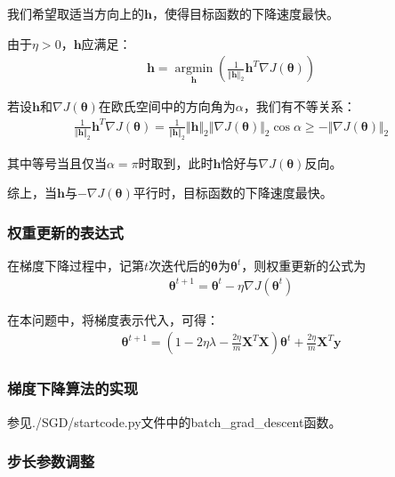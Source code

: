 \documentclass[12pt, a4paper]{article}
\newcommand{\imat}{\bm}
\newcommand{\ivec}{\bm}
\newcommand{\argmin}{\mathop{\arg\min}\limits_}
\newcommand{\Xm}{\imat{X}}
\newcommand{\thetav}{\ivec{\theta}}
\newcommand{\yv}{\ivec{y}}
\newcommand{\hv}{\ivec{h}}
\begin{document}
        我们希望取适当方向上的$\hv$，使得目标函数的下降速度最快。

        由于$\eta > 0$，$\hv$应满足：
        \begin{align*}
        \hv = \argmin{\hv} (\frac{1}{\Vert \hv \Vert_2} \hv^T \nabla J(\thetav))
        \end{align*}

        若设$\hv$和$\nabla J(\thetav)$在欧氏空间中的方向角为$\alpha$，我们有不等关系：
        \begin{align*}
        \frac{1}{\Vert \hv \Vert_2} \hv^T \nabla J(\thetav)
        = \frac{1}{\Vert \hv \Vert_2} \Vert \hv\Vert_2 \Vert \nabla J(\thetav) \Vert_2 \cos{\alpha}
        \ge - \Vert \nabla J(\thetav) \Vert_2
        \end{align*}

        其中等号当且仅当$\alpha = \pi$时取到，此时$\hv$恰好与$\nabla J(\thetav)$反向。

        综上，当$\hv$与$- \nabla J(\thetav)$平行时，目标函数的下降速度最快。

    \subsubsection{权重更新的表达式}

        在梯度下降过程中，记第$t$次迭代后的$\thetav$为$\thetav^t$，则权重更新的公式为
        \begin{equation}\begin{aligned}
        \thetav^{t+1} = \thetav^t - \eta \nabla J(\thetav^t)
        \end{aligned}\end{equation}

        在本问题中，将梯度表示代入，可得：
        \begin{align*}
        \thetav^{t+1} = (1 - 2 \eta \lambda - \frac{2 \eta}{m} \Xm^T \Xm) \thetav^t + \frac{2 \eta}{m} \Xm^T \yv
        \end{align*}

    \subsubsection{梯度下降算法的实现}

        参见./SGD/startcode.py文件中的batch\_grad\_descent函数。

    \subsubsection{步长参数调整}
\end{document}
